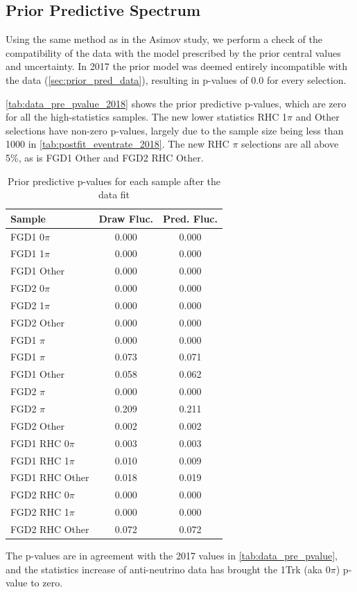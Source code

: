 \subsection{Prior Predictive Spectrum}
Using the same method as in the Asimov study, we perform a check of the compatibility of the data with the model prescribed by the prior central values and uncertainty. In 2017 the prior model was deemed entirely incompatible with the data (\autoref{sec:prior_pred_data}), resulting in p-values of 0.0 for every selection.

\autoref{tab:data_pre_pvalue_2018} shows the prior predictive p-values, which are zero for all the high-statistics samples. The new lower statistics RHC 1$\pi$ and Other selections have non-zero p-values, largely due to the sample size being less than 1000 in \autoref{tab:postfit_eventrate_2018}. The new RHC $\pi$ selections are all above 5\%, as is FGD1 \numubar Other and FGD2 \numu RHC Other.
\begin{table}[h]
	\centering
	\begin{tabular}{l | c c }
		\hline \hline
		Sample & Draw Fluc. & Pred. Fluc. \\
		\hline
		FGD1 0$\pi$ & 0.000 & 0.000 \\
		FGD1 1$\pi$ & 0.000 & 0.000 \\
		FGD1 Other  & 0.000 & 0.000 \\
		\hline
		FGD2 0$\pi$ & 0.000 & 0.000 \\
		FGD2 1$\pi$ & 0.000 & 0.000 \\
		FGD2 Other  & 0.000 & 0.000 \\
		\hline
		FGD1 \numubar 0$\pi$ & 0.000 & 0.000 \\
		FGD1 \numubar 1$\pi$ & 0.073 & 0.071 \\
		FGD1 \numubar Other  & 0.058 & 0.062 \\
		\hline
		FGD2 \numubar 0$\pi$ & 0.000 & 0.000 \\
		FGD2 \numubar 1$\pi$ & 0.209 & 0.211 \\
		FGD2 \numubar Other  & 0.002 & 0.002 \\
		\hline
		FGD1 \numu RHC 0$\pi$ & 0.003 & 0.003 \\
		FGD1 \numu RHC 1$\pi$ & 0.010 & 0.009 \\
		FGD1 \numu RHC Other  & 0.018 & 0.019 \\
		\hline
		FGD2 \numu RHC 0$\pi$ & 0.000 & 0.000 \\
		FGD2 \numu RHC 1$\pi$ & 0.000 & 0.000 \\
		FGD2 \numu RHC Other  & 0.072 & 0.072 \\
		\hline
		\hline
	\end{tabular}
	\caption{Prior predictive p-values for each sample after the data fit}
	\label{tab:data_pre_pvalue_2018}
\end{table}
The p-values are in agreement with the 2017 values in \autoref{tab:data_pre_pvalue}, and the statistics increase of anti-neutrino data has brought the 1Trk (aka 0$\pi$) p-value to zero.

